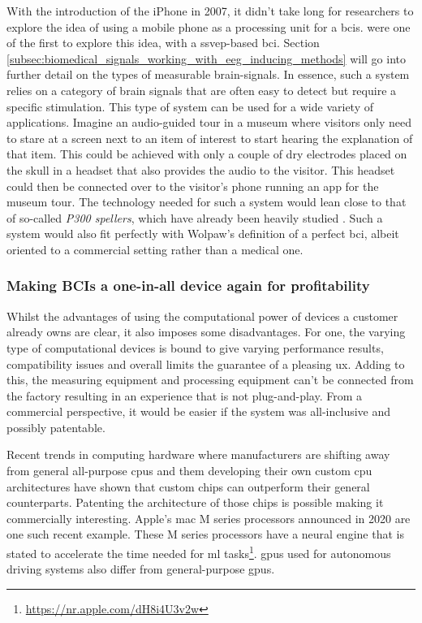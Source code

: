 With the introduction of the iPhone in 2007, it didn't take long for researchers to explore the idea of using a mobile phone as a processing unit for a \glspl{bci}.
\citet{early_bci_phone} were one of the first to explore this idea, with a \gls{ssvep}-based \gls{bci}.
Section \ref{subsec:biomedical_signals_working_with_eeg_inducing_methods} will go into further detail on the types of measurable brain-signals.
In essence, such a system relies on a category of brain signals that are often easy to detect but require a specific stimulation.
This type of system can be used for a wide variety of applications.
Imagine an audio-guided tour in a museum where visitors only need to stare at a screen next to an item of interest to start hearing the explanation of that item.
This could be achieved with only a couple of dry electrodes placed on the skull in a headset that also provides the audio to the visitor.
This headset could then be connected over  to the visitor's phone running an app for the museum tour.
The technology needed for such a system would lean close to that of so-called \textit{P300 spellers}, which have already been heavily studied \citep{p300_spellers_review, p300_keyboard_flashing, p300_spellers}.
Such a system would also fit perfectly with Wolpaw's definition of a perfect \gls{bci}, albeit oriented to a commercial setting rather than a medical one.


\subsubsection{Making BCIs a one-in-all device again for profitability}
\label{subsubsec:bci_gaining_popularity_better_processing_profitibility}

Whilst the advantages of using the computational power of devices a customer already owns are clear, it also imposes some disadvantages.
For one, the varying type of computational devices is bound to give varying performance results, compatibility issues and overall limits the guarantee of a pleasing \gls{ux}.
Adding to this, the measuring equipment and processing equipment can't be connected from the factory resulting in an experience that is not plug-and-play.
From a commercial perspective, it would be easier if the system was all-inclusive and possibly patentable. 

Recent trends in computing hardware where manufacturers are shifting away from general all-purpose \glspl{cpu} and them developing their own custom \gls{cpu} architectures have shown that custom chips can outperform their general counterparts.
Patenting the architecture of those chips is possible making it commercially interesting.
Apple's mac M series processors announced in 2020 are one such recent example.
These M series processors have a neural engine that is stated to accelerate the time needed for \gls{ml} tasks\footnote{\url{https://nr.apple.com/dH8i4U3v2w}}.
\Glspl{gpu} used for autonomous driving systems also differ from general-purpose \glspl{gpu}.

